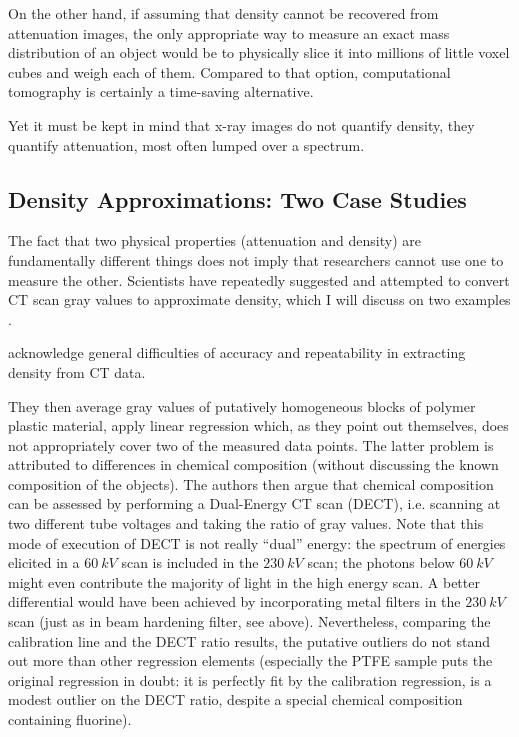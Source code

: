 On the other hand, if assuming that density cannot be recovered from attenuation images, the only appropriate way to measure an exact mass distribution of an object would be to physically slice it into millions of little voxel cubes and weigh each of them.
Compared to that option, computational tomography is certainly a time-saving alternative.


Yet it must be kept in mind that x-ray images do not quantify density, they quantify attenuation, most often lumped over a spectrum.
\subsection{Density Approximations: Two Case Studies}
\label{sec:orgce38d03}
The fact that two physical properties (attenuation and density) are fundamentally different things does not imply that researchers cannot use one to measure the other.
Scientists have repeatedly suggested and attempted to convert CT scan gray values to approximate density, which I will discuss on two examples \citep{DuPlessis2013,Durston2022}.

\medskip
\citet{DuPlessis2013} acknowledge general difficulties of accuracy and repeatability in extracting density from CT data.

They then average gray values of putatively homogeneous blocks of polymer plastic material, apply linear regression which, as they point out themselves, does not appropriately cover two of the measured data points.
The latter problem is attributed to differences in chemical composition (without discussing the known composition of the objects).
The authors then argue that chemical composition can be assessed by performing a Dual-Energy CT scan (DECT), i.e. scanning at two different tube voltages and taking the ratio of gray values.
Note that this mode of execution of DECT is not really ``dual'' energy: the spectrum of energies elicited in a \(60\ kV\) scan is included in the \(230\ kV\) scan; the photons below \(60\ kV\) might even contribute the majority of light in the high energy scan.
A better differential would have been achieved by incorporating metal filters in the \(230\ kV\) scan (just as in beam hardening filter, see above).
Nevertheless, comparing the calibration line and the DECT ratio results, the putative outliers do not stand out more than other regression elements (especially the PTFE sample puts the original regression in doubt: it is perfectly fit by the calibration regression, is a modest outlier on the DECT ratio, despite a special chemical composition containing fluorine).

